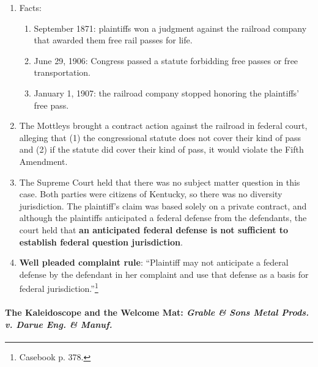 \begin{enumerate}
    \item Facts:
    \begin{enumerate}
        \item September 1871: plaintiffs won a judgment against the railroad 
        company that awarded them free rail passes for life.
        \item June 29, 1906: Congress passed a statute forbidding free passes 
        or free transportation.
        \item January 1, 1907: the railroad company stopped honoring the 
        plaintiffs' free pass.
    \end{enumerate}
    \item The Mottleys brought a contract action against the railroad in 
    federal court, alleging that (1) the congressional statute does not cover 
    their kind of pass and (2) if the statute did cover their kind of pass, it 
    would violate the Fifth Amendment.
    \item The Supreme Court held that there was no subject matter question in 
    this case. Both parties were citizens of Kentucky, so there was no 
    diversity jurisdiction. The plaintiff's claim was based solely on a 
    private contract, and although the plaintiffs anticipated a federal 
    defense from the defendants, the court held that \textbf{an anticipated 
    federal defense is not sufficient to establish federal question 
    jurisdiction}.
    \item \textbf{Well pleaded complaint rule}: ``Plaintiff may not anticipate 
    a federal defense by the defendant in her complaint and use that defense 
    as a basis for federal jurisdiction.''\footnote{Casebook p. 378.}
\end{enumerate}

\paragraph{The Kaleidoscope and the Welcome Mat: \emph{Grable \& Sons Metal 
Prods. v. Darue Eng. \& Manuf.}}

